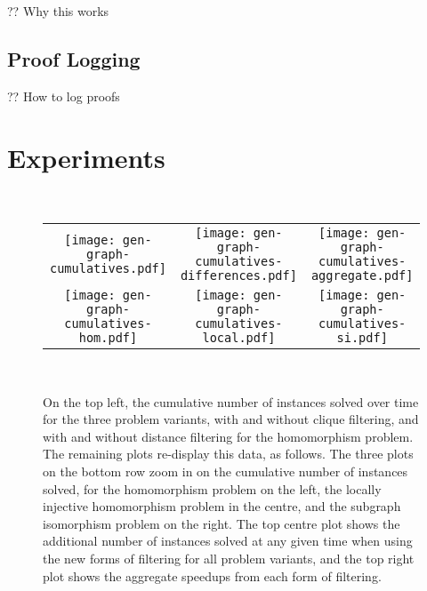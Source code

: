 \documentclass{article}
\begin{document}
?? Why this works

\subsection{Proof Logging}

?? How to log proofs

\section{Experiments}

\begin{figure*}[p]
    \,\hfill\begin{tabular}{c@{}c@{}c@{}}
    \texttt{[image: gen-graph-cumulatives.pdf]}
        &
    \texttt{[image: gen-graph-cumulatives-differences.pdf]}
        &
    \texttt{[image: gen-graph-cumulatives-aggregate.pdf]}
        \\[5mm]
    \texttt{[image: gen-graph-cumulatives-hom.pdf]}
        &
    \texttt{[image: gen-graph-cumulatives-local.pdf]}
        &
    \texttt{[image: gen-graph-cumulatives-si.pdf]}
    \end{tabular}\hfill\,

    \caption{On the top left, the cumulative number of instances solved over time for the three
    problem variants, with and without clique filtering, and with and without distance filtering for
    the homomorphism problem. The remaining plots re-display this data, as follows. The three plots
    on the bottom row zoom in on the cumulative number of instances solved, for the homomorphism
    problem on the left, the locally injective homomorphism problem in the centre, and the subgraph
    isomorphism problem on the right. The top centre plot shows the additional number of instances
    solved at any given time when using the new forms of filtering for all problem variants, and the
    top right plot shows the aggregate speedups from each form of filtering.}
\end{figure*}
\end{document}
